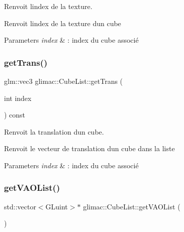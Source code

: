 Renvoit l\textquotesingle{}index de la texture. 

Renvoit l\textquotesingle{}index de la texture d\textquotesingle{}un cube


\begin{DoxyParams}{Parameters}
{\em index} & \+: index du cube associé \\
\hline
\end{DoxyParams}
\mbox{\label{classglimac_1_1CubeList_a33c4eac5107d29b79941ddf0d790fa38}} 
\subsubsection{\texorpdfstring{get\+Trans()}{getTrans()}}
{\footnotesize\ttfamily glm\+::vec3 glimac\+::\+Cube\+List\+::get\+Trans (\begin{DoxyParamCaption}\item[{int}]{index }\end{DoxyParamCaption}) const\hspace{0.3cm}{\ttfamily [inline]}}



Renvoit la translation d\textquotesingle{}un cube. 

Renvoit le vecteur de translation d\textquotesingle{}un cube dans la liste


\begin{DoxyParams}{Parameters}
{\em index} & \+: index du cube associé \\
\hline
\end{DoxyParams}
\mbox{\label{classglimac_1_1CubeList_aeb6239962da1abae9cfc0e773b71c485}} 
\subsubsection{\texorpdfstring{get\+V\+A\+O\+List()}{getVAOList()}}
{\footnotesize\ttfamily std\+::vector$<$G\+Luint$>$$\ast$ glimac\+::\+Cube\+List\+::get\+V\+A\+O\+List (\begin{DoxyParamCaption}{ }\end{DoxyParamCaption})\hspace{0.3cm}{\ttfamily [inline]}}



